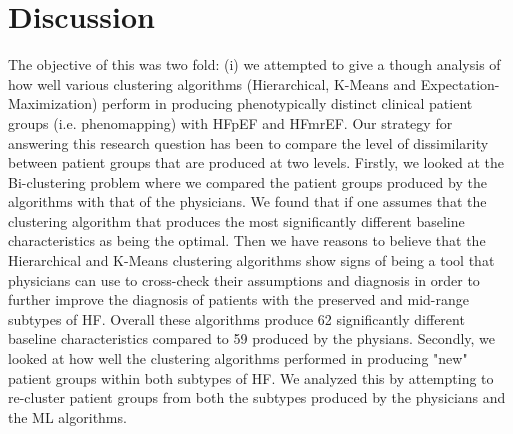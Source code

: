 \documentclass[../thesis.tex]{subfiles}
\begin{document}
\section{Discussion}

\noindent The objective of this was two fold: (i) we attempted to give a though analysis of how well various clustering algorithms (Hierarchical, K-Means and Expectation-Maximization) perform in producing phenotypically distinct clinical patient groups (i.e. phenomapping) with HFpEF and HFmrEF. Our strategy for answering this research question has been to compare the level of dissimilarity between patient groups that are produced at two levels. Firstly, we looked at the Bi-clustering problem where we compared the patient groups produced by the algorithms with that of the physicians. We found that if one assumes that the clustering algorithm that produces the most significantly different baseline characteristics as being the optimal. Then we have reasons to believe that the Hierarchical and K-Means clustering algorithms show signs of being a tool that physicians can use to cross-check their assumptions and diagnosis in order to further improve the diagnosis of patients with the preserved and mid-range subtypes of HF. Overall these algorithms produce 62 significantly different baseline characteristics compared to 59 produced by the physians. Secondly, we looked at how well the clustering algorithms performed in producing "new" patient groups within both subtypes of HF. We analyzed this by attempting to re-cluster patient groups from both the subtypes produced by the physicians and the ML algorithms. 
\end{document}
